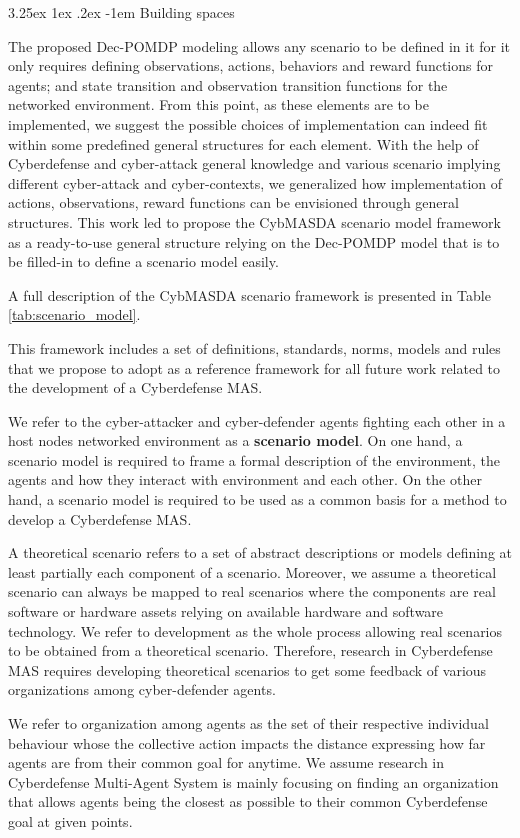 \documentclass[conference]{IEEEtran}
\makeatletter
\renewcommand\subparagraph{\@startsection{subparagraph}{6}{\parindent}%
  {3.25ex \@plus1ex \@minus .2ex}%
  {-1em}%
  {\normalfont\normalsize\bfseries}}
\makeatother
\begin{document}
\subparagraph{Building spaces}

The proposed Dec-POMDP modeling\cite{soule2023} allows any scenario to be defined in it for it only requires defining observations, actions, behaviors and reward functions for agents; and state transition and observation transition functions for the networked environment.
From this point, as these elements are to be implemented, we suggest the possible choices of implementation can indeed fit within some predefined general structures for each element. With the help of Cyberdefense and cyber-attack general knowledge and various scenario implying different cyber-attack and cyber-contexts, we generalized how implementation of actions, observations, reward functions can be envisioned through general structures. This work led to propose the CybMASDA scenario model framework as a ready-to-use general structure relying on the Dec-POMDP model that is to be filled-in to define a scenario model easily.

A full description of the CybMASDA scenario framework is presented in Table \ref{tab:scenario_model}.



This framework includes a set of definitions, standards, norms, models and rules that we propose to adopt as a reference framework for all future work related to the development of a Cyberdefense MAS.

We refer to the cyber-attacker and cyber-defender agents fighting each other in a host nodes networked environment as a \textbf{scenario model}. On one hand, a scenario model is required to frame a formal description of the environment, the agents and how they interact with environment and each other. On the other hand, a scenario model is required to be used as a common basis for a method to develop a Cyberdefense MAS.

A theoretical scenario refers to a set of abstract descriptions or models defining at least partially each component of a scenario. Moreover, we assume a theoretical scenario can always be mapped to real scenarios where the components are real software or hardware assets relying on available hardware and software technology. We refer to development as the whole process allowing real scenarios to be obtained from a theoretical scenario. Therefore, research in Cyberdefense MAS requires developing theoretical scenarios to get some feedback of various organizations among cyber-defender agents.

We refer to organization among agents as the set of their respective individual behaviour whose the collective action impacts the distance expressing how far agents are from their common goal for anytime. We assume research in Cyberdefense Multi-Agent System is mainly focusing on finding an organization that allows agents being the closest as possible to their common Cyberdefense goal at given points.
\end{document}
